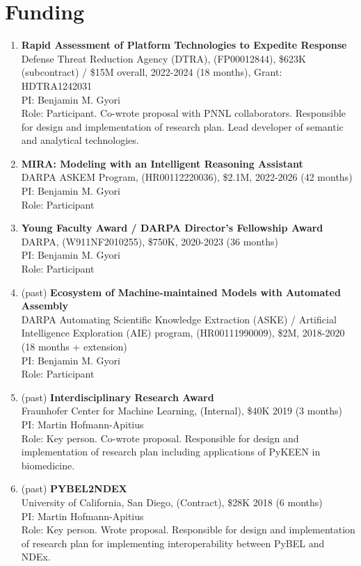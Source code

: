 \documentclass[10pt,a4paper,sans]{moderncv} %
\begin{document}
\section{Funding}
    \begin{enumerate}
    \itemsep0.75em
    \item  \textbf{Rapid Assessment of Platform Technologies to Expedite Response}\\
        Defense Threat Reduction Agency (DTRA), (FP00012844), \$623K (subcontract) / \$15M overall, 2022-2024 (18 months), Grant: HDTRA1242031\\
        PI: Benjamin M. Gyori\\
        Role: Participant. Co-wrote proposal with PNNL collaborators. Responsible for design and implementation of research plan. Lead developer of semantic and analytical technologies.
    \item  \textbf{MIRA: Modeling with an Intelligent Reasoning Assistant}\\
        DARPA ASKEM Program, (HR00112220036), \$2.1M, 2022-2026 (42 months)\\
        PI: Benjamin M. Gyori\\
        Role: Participant
    \item  \textbf{Young Faculty Award / DARPA Director’s Fellowship Award}\\
        DARPA, (W911NF2010255), \$750K, 2020-2023 (36 months)\\
        PI: Benjamin M. Gyori\\
        Role: Participant
    \item (past) \textbf{Ecosystem of Machine-maintained Models with Automated Assembly}\\
        DARPA Automating Scientific Knowledge Extraction (ASKE) / Artificial Intelligence Exploration (AIE) program, (HR00111990009), \$2M, 2018-2020 (18 months + extension)\\
        PI: Benjamin M. Gyori\\
        Role: Participant
    \item (past) \textbf{Interdisciplinary Research Award}\\
        Fraunhofer Center for Machine Learning, (Internal), \$40K 2019 (3 months)\\
        PI: Martin Hofmann-Apitius\\
        Role: Key person. Co-wrote proposal. Responsible for design and implementation of research plan including applications of PyKEEN in biomedicine.
    \item (past) \textbf{PYBEL2NDEX}\\
        University of California, San Diego, (Contract), \$28K 2018 (6 months)\\
        PI: Martin Hofmann-Apitius\\
        Role: Key person. Wrote proposal. Responsible for design and implementation of research plan for implementing interoperability between PyBEL and NDEx.
    \end{enumerate}
\end{document}
